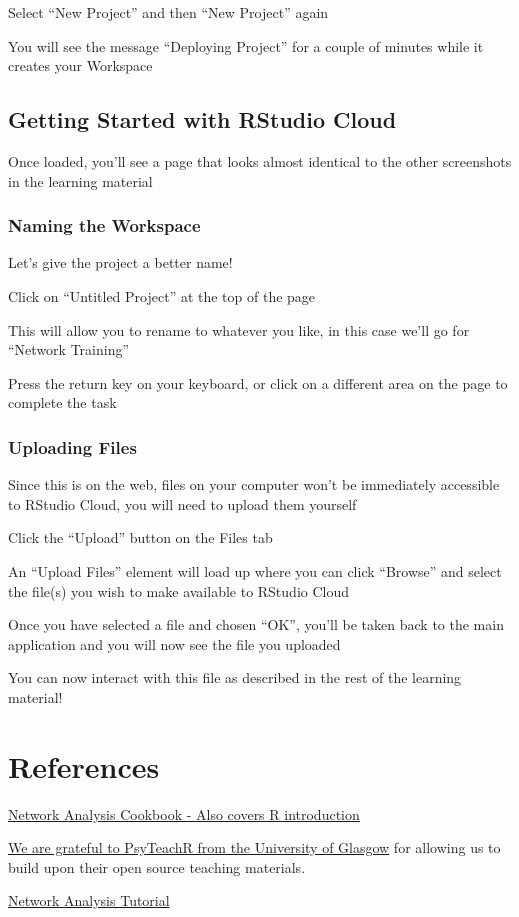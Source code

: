 \documentclass[]{book}
\begin{document}
Select ``New Project'' and then ``New Project'' again

You will see the message ``Deploying Project'' for a couple of minutes while it creates your Workspace

\hypertarget{getting-started-with-rstudio-cloud}{%
\section{Getting Started with RStudio Cloud}\label{getting-started-with-rstudio-cloud}}

Once loaded, you'll see a page that looks almost identical to the other screenshots in the learning material

\hypertarget{naming-the-workspace}{%
\subsection{Naming the Workspace}\label{naming-the-workspace}}

Let's give the project a better name!

Click on ``Untitled Project'' at the top of the page

This will allow you to rename to whatever you like, in this case we'll go for ``Network Training''

Press the return key on your keyboard, or click on a different area on the page to complete the task

\hypertarget{uploading-files}{%
\subsection{Uploading Files}\label{uploading-files}}

Since this is on the web, files on your computer won't be immediately accessible to RStudio Cloud, you will need to upload them yourself

Click the ``Upload'' button on the Files tab

An ``Upload Files'' element will load up where you can click ``Browse'' and select the file(s) you wish to make available to RStudio Cloud

Once you have selected a file and chosen ``OK'', you'll be taken back to the main application and you will now see the file you uploaded

You can now interact with this file as described in the rest of the learning material!

\hypertarget{references}{%
\chapter{References}\label{references}}

\href{http://sachaepskamp.com/files/Cookbook.html}{Network Analysis Cookbook - Also covers R introduction}

\href{https://psyteachr.github.io/}{We are grateful to PsyTeachR from the University of Glasgow} for allowing us to build upon their open source teaching materials.

\href{https://www.tandfonline.com/doi/full/10.1080/21642850.2018.1521283}{Network Analysis Tutorial}


\end{document}
